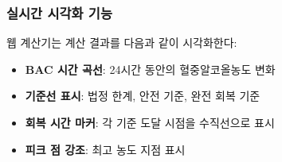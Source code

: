 \documentclass[11pt]{article}
\begin{document}
\subsubsection{실시간 시각화 기능}

웹 계산기는 계산 결과를 다음과 같이 시각화한다:

\begin{itemize}
    \item \textbf{BAC 시간 곡선}: 24시간 동안의 혈중알코올농도 변화
    \item \textbf{기준선 표시}: 법정 한계, 안전 기준, 완전 회복 기준
    \item \textbf{회복 시간 마커}: 각 기준 도달 시점을 수직선으로 표시
    \item \textbf{피크 점 강조}: 최고 농도 지점 표시
\end{itemize}









\end{document}

